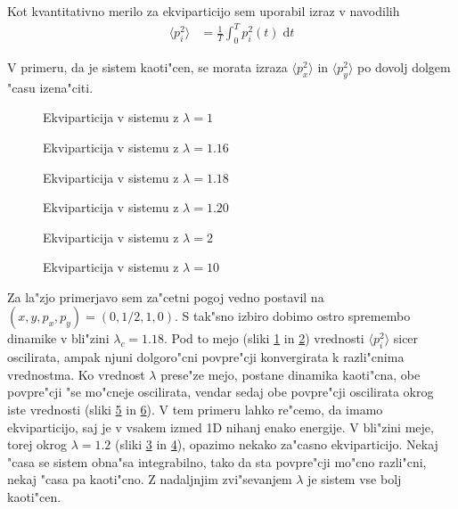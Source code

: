 \documentclass[a4paper,10pt]{article}
\begin{document}
Kot kvantitativno merilo za ekviparticijo sem uporabil izraz v navodilih
\begin{align}
 \langle p_i^2\rangle &= \frac{1}{T} \int_0^T p_i^2(t) \; \mathrm{d}t
\end{align}

V primeru, da je sistem kaoti"cen, se morata izraza $\langle p_x^2\rangle$ in $\langle p_y^2\rangle$ po dovolj dolgem "casu izena"citi. 

\begin{figure}[H]

\caption{Ekviparticija v sistemu z $\lambda = 1$}
\label{fig:eq-lambda-1}
\end{figure}

\begin{figure}[H]

\caption{Ekviparticija v sistemu z $\lambda = 1.16$}
\label{fig:eq-lambda-low}
\end{figure}

\begin{figure}[H]

\caption{Ekviparticija v sistemu z $\lambda = 1.18$}
\label{fig:eq-lambda-mid}
\end{figure}

\begin{figure}[H]

\caption{Ekviparticija v sistemu z $\lambda = 1.20$}
\label{fig:eq-lambda-high}
\end{figure}

\begin{figure}[H]

\caption{Ekviparticija v sistemu z $\lambda = 2$}
\label{fig:eq-lambda-2}
\end{figure}

\begin{figure}[H]

\caption{Ekviparticija v sistemu z $\lambda = 10$}
\label{fig:eq-lambda-10}
\end{figure}


Za la"zjo primerjavo sem za"cetni pogoj vedno postavil na $(x, y, p_x, p_y) = (0, 1/2, 1, 0)$. S tak"sno izbiro dobimo ostro spremembo dinamike v bli"zini $\lambda_c = 1.18$. Pod to mejo (sliki \ref{fig:eq-lambda-1} in \ref{fig:eq-lambda-low}) vrednosti $\langle p_i^2 \rangle$ sicer oscilirata, ampak njuni dolgoro"cni povpre"cji konvergirata k razli"cnima vrednostma. Ko vrednost $\lambda$ prese"ze mejo, postane dinamika kaoti"cna, obe povpre"cji "se mo"cneje oscilirata, vendar sedaj obe povpre"cji oscilirata okrog iste vrednosti (sliki \ref{fig:eq-lambda-2} in \ref{fig:eq-lambda-10}). V tem primeru lahko re"cemo, da imamo ekviparticijo, saj je v vsakem izmed 1D nihanj enako energije. V bli"zini meje, torej okrog $\lambda = 1.2$ (sliki \ref{fig:eq-lambda-mid} in \ref{fig:eq-lambda-high}), opazimo nekako za"casno ekviparticijo. Nekaj "casa se sistem obna"sa integrabilno, tako da sta povpre"cji mo"cno razli"cni, nekaj "casa pa kaoti"cno. Z nadaljnjim zvi"sevanjem $\lambda$ je sistem vse bolj kaoti"cen. 
\end{document}
